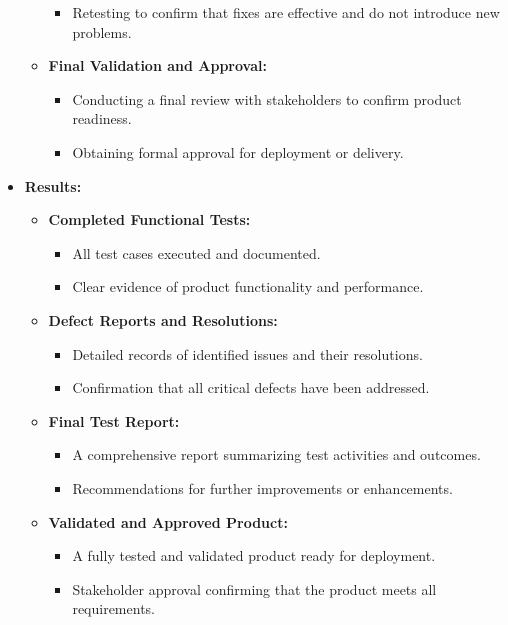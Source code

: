 \documentclass{article}
\begin{document}
\begin{itemize}[leftmargin=*, label={}]
\begin{itemize}
\begin{itemize}
            \item Retesting to confirm that fixes are effective and do not introduce new problems.
        \end{itemize}
        \item \textbf{Final Validation and Approval:}
        \begin{itemize}
            \item Conducting a final review with stakeholders to confirm product readiness.
            \item Obtaining formal approval for deployment or delivery.
        \end{itemize}
    \end{itemize}

    \item \textbf{Results:}
    \begin{itemize}
        \item \textbf{Completed Functional Tests:}
        \begin{itemize}
            \item All test cases executed and documented.
            \item Clear evidence of product functionality and performance.
        \end{itemize}
        \item \textbf{Defect Reports and Resolutions:}
        \begin{itemize}
            \item Detailed records of identified issues and their resolutions.
            \item Confirmation that all critical defects have been addressed.
        \end{itemize}
        \item \textbf{Final Test Report:}
        \begin{itemize}
            \item A comprehensive report summarizing test activities and outcomes.
            \item Recommendations for further improvements or enhancements.
        \end{itemize}
        \item \textbf{Validated and Approved Product:}
        \begin{itemize}
            \item A fully tested and validated product ready for deployment.
            \item Stakeholder approval confirming that the product meets all requirements.
        \end{itemize}
    \end{itemize}
\end{itemize}
\end{document}
